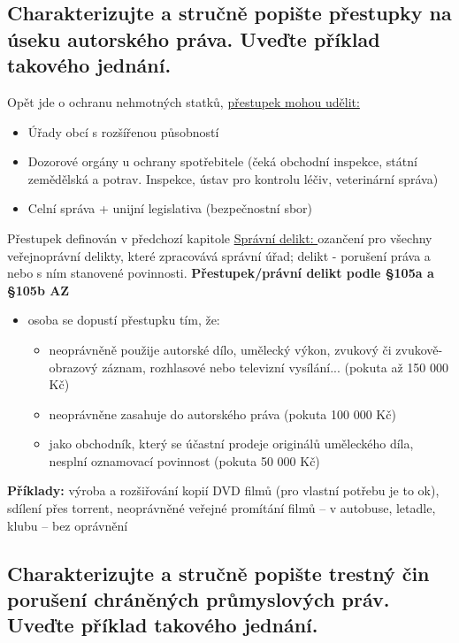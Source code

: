 \subsection{Charakterizujte a stručně popište přestupky na úseku autorského práva. Uveďte příklad takového jednání.}
Opět jde o ochranu nehmotných statků, \underline{přestupek mohou udělit:}
\begin{itemize}
    \item Úřady obcí s rozšířenou působností
    \item Dozorové orgány u ochrany spotřebitele (čeká obchodní inspekce, státní zemědělská a potrav.
    Inspekce, ústav pro kontrolu léčiv, veterinární správa)
    \item Celní správa + unijní legislativa (bezpečnostní sbor)
\end{itemize}

\newline Přestupek definován v předchozí kapitole\newline
\newline\underline{Správní delikt: }ozančení pro všechny veřejnoprávní delikty, které zpracovává správní úřad; delikt - porušení práva a nebo s ním stanovené povinnosti.
\newline
\newline\textbf{Přestupek/právní delikt podle §105a a §105b AZ}
\begin{itemize}
    \item osoba se dopustí přestupku tím, že:
    \begin{itemize}
        \item neoprávněně použije autorské dílo, umělecký výkon, zvukový či
         zvukově-obrazový záznam, rozhlasové nebo televizní vysílání...
         (pokuta až 150 000 Kč)
        \item neoprávněne zasahuje do autorského práva (pokuta 100 000 Kč)
        \item jako obchodník, který se účastní prodeje originálů uměleckého
         díla, nesplní oznamovací povinnost (pokuta 50 000 Kč)
    \end{itemize}
\end{itemize}
\textbf{Příklady:} výroba a rozšiřování kopií DVD filmů (pro vlastní potřebu je to ok),
sdílení přes torrent, neoprávněné veřejné promítání filmů – v autobuse,
letadle, klubu – bez oprávnění

\subsection{Charakterizujte a stručně popište trestný čin porušení chráněných průmyslových práv. Uveďte příklad takového jednání.}

